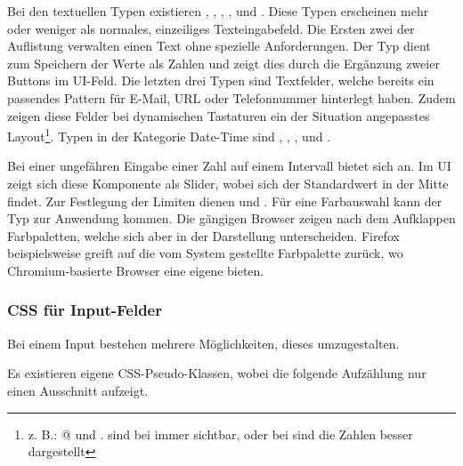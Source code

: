 Bei den textuellen Typen existieren , , , ,  und . 
Diese Typen erscheinen mehr oder weniger als normales, einzeiliges Texteingabefeld. 
Die Ersten zwei der Auflistung verwalten einen Text ohne spezielle Anforderungen. 
Der Typ  dient zum Speichern der Werte als Zahlen und zeigt dies durch die Ergänzung zweier Buttons im UI-Feld. 
Die letzten drei Typen sind Textfelder, welche bereits ein passendes Pattern für E-Mail, URL oder Telefonnummer hinterlegt haben. 
Zudem zeigen diese Felder bei dynamischen Tastaturen ein der Situation angepasstes Layout\footnote{
    z. B.: @ und . sind bei  immer sichtbar, oder bei  sind die Zahlen besser dargestellt
}. 
Typen in der Kategorie Date-Time sind , , ,  und . 

Bei einer ungefähren Eingabe einer Zahl auf einem Intervall bietet sich  an. 
Im UI zeigt sich diese Komponente als Slider, wobei sich der Standardwert in der Mitte findet. 
Zur Festlegung der Limiten dienen  und . 
Für eine Farbauswahl kann der Typ  zur Anwendung kommen. 
Die gängigen Browser zeigen nach dem Aufklappen Farbpaletten, welche sich aber in der Darstellung unterscheiden. 
Firefox beispielsweise greift auf die vom System gestellte Farbpalette zurück, wo Chromium-basierte Browser eine eigene bieten. 


\subsubsection{{\color{dgray} CSS für Input-Felder}}
\label{sec:inputCss}

Bei einem Input bestehen mehrere Möglichkeiten, dieses umzugestalten. 

Es existieren eigene CSS-Pseudo-Klassen, wobei die folgende Aufzählung nur einen Ausschnitt aufzeigt. 


